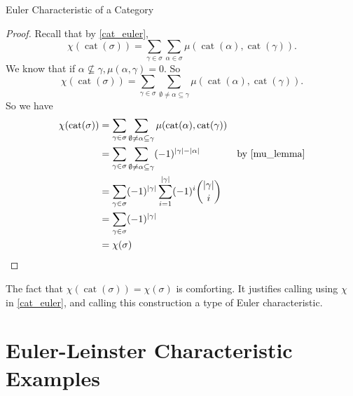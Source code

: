 \documentclass[12pt]{pom_thesis}
\DeclareMathOperator{\cat}{cat}
\begin{document}
\begin{chapter}{Euler Characteristic of a Category}
\begin{thm}
\end{thm}
\begin{proof}
Recall that by \ref{cat_euler}, 
\[
\chi(\cat(\sigma)) = \sum_{\gamma \in \sigma} \sum_{\alpha \in \sigma} \mu(\cat(\alpha), \cat(\gamma)).
\]
We know that if $\alpha \not \subseteq \gamma, \mu(\alpha, \gamma) = 0$. So
\[
\chi(\cat(\sigma)) = \sum_{\gamma \in \sigma} \sum_{\emptyset \neq \alpha \subseteq \gamma}\mu(\cat(\alpha), \cat(\gamma)).
\]
So we have
\begin{align*}
\chi(\cat(\sigma)) &= \sum_{\gamma \in \sigma} \sum_{\emptyset \neq \alpha \subseteq \gamma}\mu(\cat(\alpha), \cat(\gamma))\\
&= \sum_{\gamma \in \sigma} \sum_{\emptyset \neq \alpha \subseteq \gamma}(-1)^{|\gamma| - |\alpha|} &\text{by \ref{mu_lemma}}\\
&= \sum_{\gamma \in \sigma}(-1)^{|\gamma|} \sum_{i = 1}^{|\gamma|} (-1)^i{|\gamma| \choose i}\\
&= \sum_{\gamma \in \sigma} (-1)^{|\gamma|} \\
&= \chi(\sigma)
\end{align*}
\end{proof}
The fact that $\chi(\cat(\sigma)) = \chi(\sigma)$ is comforting. It justifies calling using $\chi$ in \ref{cat_euler}, and calling this construction a type of Euler characteristic.

\section{Euler-Leinster Characteristic Examples}


\end{chapter}
\end{document}
